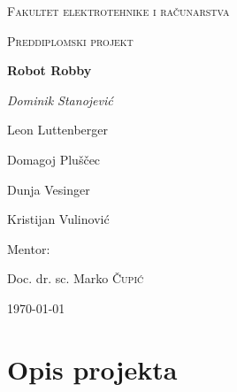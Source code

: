 \documentclass[times, utf8, numeric]{fer}
\begin{document}
\nocite{*}

\begin{titlepage}
	\centering
	{\scshape\LARGE Fakultet elektrotehnike i računarstva \par}
	\vspace{1cm}
	{\scshape\Large Preddiplomski projekt\par}
	\vspace{1.5cm}
	{\huge\bfseries Robot Robby\par}
	\vspace{2cm}
	{\Large\itshape
	Dominik Stanojević \par
	Leon Luttenberger \par
	Domagoj Pluščec \par
	Dunja Vesinger \par
	Kristijan Vulinović\par}
	\vfill
	Mentor:\par
	Doc. dr. sc. Marko \textsc{Čupić}

	\vfill

	{\large \today\par}
\end{titlepage}

\tableofcontents

\pagebreak

\section{Opis projekta}
\end{document}

